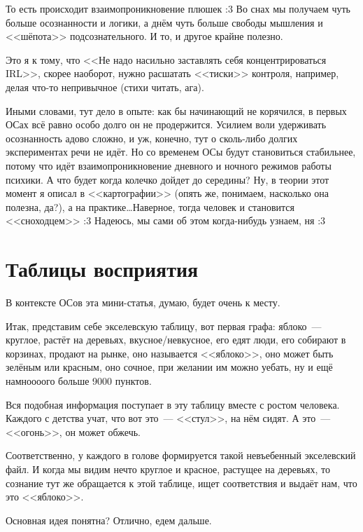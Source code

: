 \documentclass[a4paper,14pt,oneside]{memoir}
\begin{document}
То есть происходит взаимопроникновение плюшек :3 Во снах мы получаем чуть больше осознанности и логики, а днём чуть больше свободы мышления и <<шёпота>> подсознательного. И то, и другое крайне полезно.
 
Это я к тому, что <<Не надо насильно заставлять себя концентрироваться IRL>>, скорее наоборот, нужно расшатать <<тиски>> контроля, например, делая что-то непривычное (стихи читать, ага).
 
Иными словами, тут дело в опыте: как бы начинающий не корячился, в первых ОСах всё равно особо долго он не продержится. Усилием воли удерживать осознанность адово сложно, и уж, конечно, тут о сколь-либо долгих экспериментах речи не идёт. Но со временем ОСы будут становиться стабильнее, потому что идёт взаимопроникновение дневного и ночного режимов работы психики. А что будет когда колечко дойдет до середины? Ну, в теории этот момент я описал в <<картографии>> (опять же, понимаем, насколько она полезна, да?), а на практике\ldots Наверное, тогда человек и становится <<сноходцем>> :3 Надеюсь, мы сами об этом когда-нибудь узнаем, ня :3 



\section{Таблицы восприятия}
В контексте ОСов эта мини-статья, думаю, будет очень к месту. 

Итак, представим себе экселевскую таблицу, вот первая графа: яблоко~--- круглое, растёт на деревьях, вкусное/невкусное, его едят люди, его собирают в корзинах, продают на рынке, оно называется <<яблоко>>, оно может быть зелёным или красным, оно сочное, при желании им можно уебать, ну и ещё намноооого больше 9000 пунктов. 

Вся подобная информация поступает в эту таблицу вместе с ростом человека. Каждого с детства учат, что вот это~--- <<стул>>, на нём сидят. А это~--- <<огонь>>, он может обжечь. 

Соответственно, у каждого в голове формируется такой невъебенный экселевский файл. И когда мы видим нечто круглое и красное, растущее на деревьях, то сознание тут же обращается к этой таблице, ищет соответствия и выдаёт нам, что это <<яблоко>>. 

Основная идея понятна? Отлично, едем дальше. 
\end{document}
